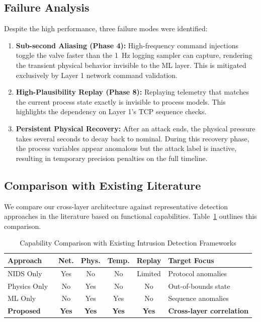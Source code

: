\documentclass[journal,twoside,web]{ieeecolor}
\begin{document}
\subsection{Failure Analysis}
Despite the high performance, three failure modes were identified:
\begin{enumerate}
    \item \textbf{Sub-second Aliasing (Phase 4):} High-frequency command injections toggle the valve faster than the 1~Hz logging sampler can capture, rendering the transient physical behavior invisible to the ML layer. This is mitigated exclusively by Layer 1 network command validation.
    \item \textbf{High-Plausibility Replay (Phase 8):} Replaying telemetry that matches the current process state exactly is invisible to process models. This highlights the dependency on Layer 1's TCP sequence checks.
    \item \textbf{Persistent Physical Recovery:} After an attack ends, the physical pressure takes several seconds to decay back to nominal. During this recovery phase, the process variables appear anomalous but the attack label is inactive, resulting in temporary precision penalties on the full timeline.

\end{enumerate}

\subsection{Comparison with Existing Literature}
We compare our cross-layer architecture against representative detection approaches in the literature based on functional capabilities. Table~\ref{tab:literature_comparison} outlines this comparison.
\begin{table}[!t]
\caption{Capability Comparison with Existing Intrusion Detection Frameworks}
\label{tab:literature_comparison}
\centering
\setlength{\tabcolsep}{4pt}
\begin{tabular}{lccccl}
\toprule
Approach & Net. & Phys. & Temp. & Replay & Target Focus \\
\midrule
NIDS Only~\cite{iec104sec2023} & Yes & No & No & Limited & Protocol anomalies \\
Physics Only~\cite{lucchese2023honeyics} & No & Yes & No & No & Out-of-bounds state \\
ML Only~\cite{umer2022machine} & No & Yes & Yes & No & Sequence anomalies \\
\textbf{Proposed} & \textbf{Yes} & \textbf{Yes} & \textbf{Yes} & \textbf{Yes} & \textbf{Cross-layer correlation} \\
\bottomrule
\end{tabular}
\end{table}
\end{document}
